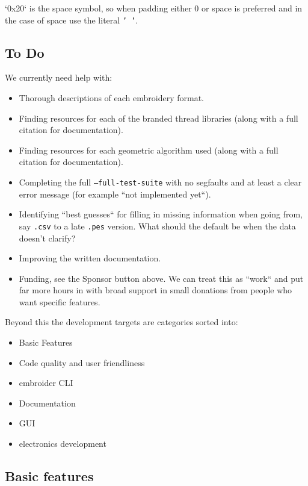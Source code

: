 \documentclass[10pt]{report}
\begin{document}
`0x20` is the space symbol, so when padding either 0 or space is preferred and
in the case of space use the literal \texttt{' '}.

\subsection{To Do}

We currently need help with:

\begin{itemize}
\item Thorough descriptions of each embroidery format.
\item Finding resources for each of the branded thread libraries (along with a
  full citation for documentation).
\item Finding resources for each geometric algorithm used (along with a full
  citation for documentation).
\item Completing the full \texttt{--full-test-suite} with no segfaults and at least a
  clear error message (for example ``not implemented yet``).
\item Identifying ``best guesses`` for filling in missing information when going
  from, say \texttt{.csv} to a late \texttt{.pes} version. What should the default be when
  the data doesn't clarify?
\item Improving the written documentation.
\item Funding, see the Sponsor button above. We can treat this as ``work`` and
  put far more hours in with broad support in small donations from people who want
  specific features.
\end{itemize}

Beyond this the development targets are categories sorted into:

\begin{itemize}
\item Basic Features
\item Code quality and user friendliness
\item embroider CLI
\item Documentation
\item GUI
\item electronics development
\end{itemize}

\subsection{Basic features}
\end{document}
